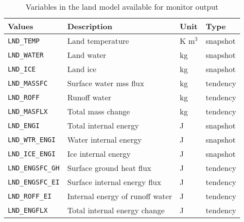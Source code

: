 \begin{table}[h]
\begin{center}
  \caption{Variables in the land model available for monitor output}
  \label{tab:varlist_monitor_land}
  \begin{tabularx}{150mm}{|l|X|l|l|} \hline
    \rowcolor[gray]{0.9}  Values & Description & Unit & Type \\ \hline
      \verb|LND_TEMP|      & Land temperature                & K m$^3$ & snapshot \\
      \verb|LND_WATER|     & Land water                      & kg   & snapshot \\
      \verb|LND_ICE|       & Land ice                        & kg   & snapshot \\
      \verb|LND_MASSFC|    & Surface water mss flux          & kg   & tendency \\
      \verb|LND_ROFF|      & Runoff water                    & kg   & tendency \\
      \verb|LND_MASFLX|    & Total mass change               & kg   & tendency \\
      \verb|LND_ENGI|      & Total internal energy           & J    & snapshot \\
      \verb|LND_WTR_ENGI|  & Water internal energy           & J    & snapshot \\
      \verb|LND_ICE_ENGI|  & Ice internal energy             & J    & snapshot \\
      \verb|LND_ENGSFC_GH| & Surface ground heat flux        & J    & tendency \\
      \verb|LND_ENGSFC_EI| & Surface internal energy flux    & J    & tendency \\
      \verb|LND_ROFF_EI|   & Internal energy of runoff water & J    & tendency \\
      \verb|LND_ENGFLX|    & Total internal energy change    & J    & tendency \\
    \hline
  \end{tabularx}
\end{center}
\end{table}

